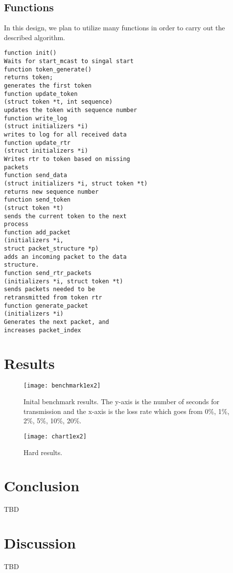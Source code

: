 \documentclass[12pt,journal,compsoc]{IEEEtran}
\begin{document}
\subsection{Functions}
In this design, we plan to utilize many functions in order to carry out the described algorithm. \\
\begin{verbatim}
function init()
Waits for start_mcast to singal start
function token_generate()
returns token;
generates the first token
function update_token
(struct token *t, int sequence)
updates the token with sequence number
function write_log
(struct initializers *i)
writes to log for all received data
function update_rtr
(struct initializers *i)
Writes rtr to token based on missing
packets
function send_data
(struct initializers *i, struct token *t)
returns new sequence number
function send_token
(struct token *t)
sends the current token to the next
process
function add_packet
(initializers *i,
struct packet_structure *p)
adds an incoming packet to the data
structure.
function send_rtr_packets
(initializers *i, struct token *t)
sends packets needed to be
retransmitted from token rtr
function generate_packet
(initializers *i)
Generates the next packet, and
increases packet_index
\end{verbatim}
\section{Results}
\begin{figure}[h]
\centering
\texttt{[image: benchmark1ex2]}
\caption{Inital benchmark results. The y-axis is the number of seconds for transmission and the x-axis is the loss rate which goes from 0\%, 1\%, 2\%, 5\%, 10\%, 20\%.}
\end{figure}

\begin{figure}[h]
\centering
\texttt{[image: chart1ex2]}
\caption{Hard results.}
\end{figure}

\section{Conclusion}
TBD
\section{Discussion}
TBD
\end{document}
